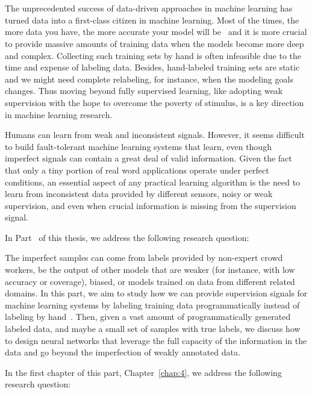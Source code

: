 \part{} %
\label{part2}
The unprecedented success of data-driven approaches in machine learning has turned data into a first-class citizen in machine learning. Most of the times, the more data you have, the more accurate your model will be~\citep{halevy2009unreasonable,sun2017revisiting} and it is more crucial to provide massive amounts of training data when the models become more deep and complex.
Collecting such training sets by hand is often infeasible due to the time and expense of labeling data. Besides, hand-labeled training sets are static and we might need complete relabeling, for instance, when the modeling goals changes. Thus moving beyond fully supervised learning, like adopting weak supervision with the hope to overcome the poverty of stimulus, is a key direction in machine learning research.

Humans can learn from weak and inconsistent signals\citep{chomsky1980rules}. However, it seems difficult to build fault-tolerant machine learning systems that learn, even though imperfect signals can contain a great deal of valid information.
Given the fact that only a tiny portion of real word applications operate under perfect conditions, an essential aspect of any practical learning algorithm is the need to learn from inconsistent data provided by different sensors, noisy or weak supervision, and even when crucial information is missing from the supervision signal.

In Part~\ref{part2} of this thesis, we address the following research question:

The imperfect samples can come from labels provided by non-expert crowd workers, be the output of other models that are weaker (for instance, with low accuracy or coverage), biased, or models trained on data from different related domains. 
In this part, we aim to study how we can provide supervision signals for machine learning systems by labeling training data programmatically instead of labeling by hand~\citep{Ratner:2016}. Then, given a vast amount of programmatically generated labeled data, and maybe a small set of samples with true labels,  we discuss how to design neural networks that leverage the full capacity of the information in the data and go beyond the imperfection of weakly annotated data.


In the first chapter of this part, Chapter~\ref{chap:4}, we address the following research question:

